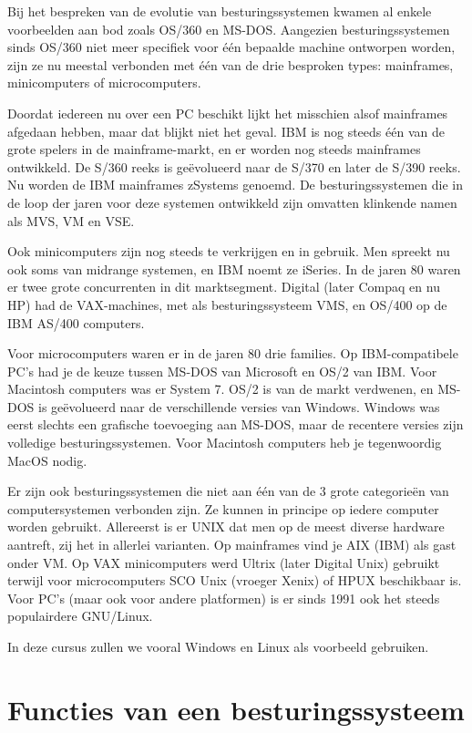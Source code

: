 Bij het bespreken van de evolutie van besturingssystemen kwamen al
enkele voorbeelden aan bod zoals OS/360 en MS-DOS. Aangezien
besturingssystemen sinds OS/360 niet meer specifiek voor \'e\'en bepaalde
machine ontworpen worden, zijn ze nu meestal verbonden met \'e\'en van de
drie besproken types: mainframes, minicomputers of
microcomputers.

Doordat iedereen nu over een PC beschikt lijkt het misschien alsof
mainframes afgedaan hebben, maar dat blijkt niet het geval. IBM is nog
steeds \'e\'en van de grote spelers in de mainframe-markt, en er worden nog
steeds mainframes ontwikkeld. De S/360 reeks is ge\"evolueerd naar de
S/370 en later de S/390 reeks. Nu worden de IBM mainframes zSystems
genoemd. De besturingssystemen die in de loop der jaren voor deze
systemen ontwikkeld zijn omvatten klinkende namen als MVS, VM en
VSE.

Ook minicomputers zijn nog steeds te verkrijgen en in gebruik. Men
spreekt nu ook soms van midrange systemen, en IBM noemt ze iSeries. In
de jaren 80 waren er twee grote concurrenten in dit marktsegment. Digital
(later Compaq en nu HP) had de VAX-machines, met als besturingssysteem
VMS, en OS/400 op de IBM AS/400 computers.

Voor microcomputers waren er in de jaren 80 drie families. Op
IBM-compatibele PC's had je de keuze tussen MS-DOS van Microsoft en OS/2
van IBM. Voor Macintosh computers was er System 7. OS/2 is van de markt
verdwenen, en MS-DOS is ge\"evolueerd naar de verschillende versies van
Windows. Windows was eerst slechts een grafische toevoeging aan MS-DOS,
maar de recentere versies zijn volledige besturingssystemen. Voor
Macintosh computers heb je tegenwoordig MacOS nodig.

Er zijn ook besturingssystemen die niet aan \'e\'en van de 3 grote
categorie\"en van computersystemen verbonden zijn. Ze kunnen in principe
op iedere computer worden gebruikt. Allereerst is er UNIX dat men op de
meest diverse hardware aantreft, zij het in allerlei varianten. Op
mainframes vind je AIX (IBM) als gast onder VM. Op VAX minicomputers
werd Ultrix (later Digital Unix) gebruikt terwijl voor microcomputers
SCO Unix (vroeger Xenix) of HPUX beschikbaar is. Voor PC's (maar ook
voor andere platformen) is er sinds 1991 ook het steeds populairdere
GNU/Linux.

In deze cursus zullen we vooral Windows en Linux als voorbeeld
gebruiken.

\section{Functies van een besturingssysteem}


